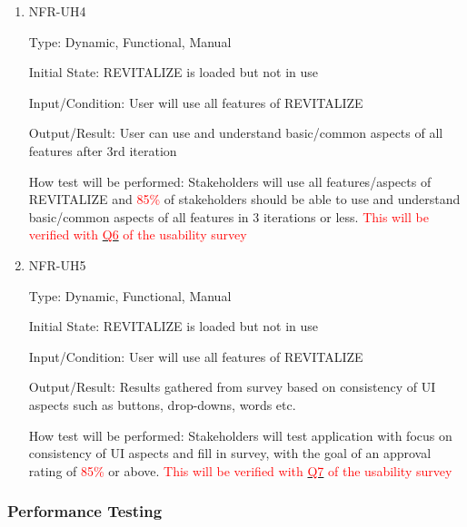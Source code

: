 \documentclass[12pt, titlepage]{article}
\begin{document}
\begin{enumerate}
	\item{NFR-UH4\\}
	
	Type: Dynamic, Functional, Manual
	
	Initial State: REVITALIZE is loaded but not in use
	
	Input/Condition: User will use all features of REVITALIZE
	
	Output/Result: User can use and understand basic/common aspects of all features after 3rd iteration
	
	How test will be performed: Stakeholders will use all features/aspects of REVITALIZE and \textcolor{red}{85\%} of stakeholders should be able to use and understand basic/common aspects of all features in 3 iterations or less. \textcolor{red}{This will be verified with \hyperlink{q6}{\textcolor{red}{Q6}} of the usability survey}
	
	\item{NFR-UH5\\}
	
	Type: Dynamic, Functional, Manual
	
	Initial State: REVITALIZE is loaded but not in use
	
	Input/Condition: User will use all features of REVITALIZE
	
	Output/Result: Results gathered from survey based on consistency of UI aspects such as buttons, drop-downs, words etc.
	
	How test will be performed: Stakeholders will test application with focus on consistency of UI aspects and fill in survey, with the goal of an approval rating of \textcolor{red}{85\%} or above. \textcolor{red}{This will be verified with \hyperlink{q7}{\textcolor{red}{Q7}} of the usability survey}
	
\end{enumerate}

\subsubsection{Performance Testing}
\end{document}
